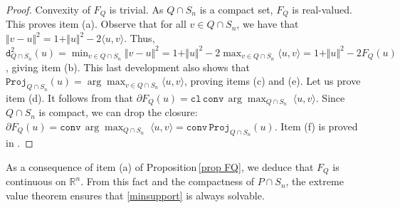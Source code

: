 \documentclass[hidelinks,onefignum,onetabnum]{siamart250211}
\theoremstyle{definition}
\theoremstyle{remark}
\newcommand{\R}{\mathbb R}
\newcommand{\inner}[2]{\langle#1,#2\rangle}
\newcommand{\norm}[1]{\textstyle{\Vert} #1 \textstyle{\Vert}}
\newcommand{\dist}{\mathtt{d}}
\newcommand{\proj}{\mathtt{Proj}}
\begin{document}
\begin{proof}
Convexity of $F_Q$ is trivial.
As $Q\cap S_n$ is a compact set, $F_Q$ is real-valued. This proves item (a).
%
    Observe that for all $v \in Q\cap S_n$, we have that $\norm{v-u}^2=1+\norm{u}^2-2\inner{u}{v}$. Thus, $\dist_{Q\cap S_n}^2(u) = \min_{v\in Q\cap S_n}\norm{v-u}^2=1+\norm{u}^2-2\max_{v\in Q\cap S_n} \inner{u}{v} = 1+\norm{u}^2-2F_Q(u)$, giving item (b).
This last development also shows  that $\proj_{Q\cap S_n}(u) =\arg\max_{v\in Q\cap S_n}\langle u,v\rangle$, proving items (c) and (e). 
Let us prove item (d).
It follows from \cite[Eq. 5]{Hantoute_Lopez_2008} that $\partial F_Q(u) = \mathtt{cl\, conv}\, \arg\max_{Q\cap S_n} \; \langle u, v \rangle$.  Since $Q \cap S_n$ is compact,  we can drop the closure: $\partial F_Q(u)=\mathtt{conv}\, \arg\max_{Q\cap S_n} \; \langle u, v \rangle= \mathtt{conv}\,\proj_{Q\cap S_n}(u)$. 
%   
Item (f) is proved in \cite[Thm 8.1]{Bauschke}. 
\end{proof}
As a consequence of item (a) of Proposition\,\ref{prop FQ}, we deduce that $F_Q$ is continuous on $\R^n$. From this fact and the compactness of $P\cap S_n$, the extreme value theorem ensures that \eqref{minsupport} is always solvable.
\end{document}
